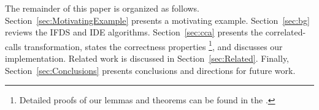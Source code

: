 The remainder of this paper is organized as follows.
%
Section~\ref{sec:MotivatingExample} presents a motivating example.
%
Section~\ref{sec:bg} reviews the IFDS and IDE algorithms.
%
Section~\ref{sec:cca} presents the correlated-calls transformation, 
states the correctness properties%
\footnote{
  Detailed proofs of our lemmas and theorems can be found in
  the \reportOrAppendix.
}, and discusses our implementation.
%
%
Related work is discussed in Section~\ref{sec:Related}.
%
Finally, Section~\ref{sec:Conclusions} presents conclusions and directions for future work.

 
 
